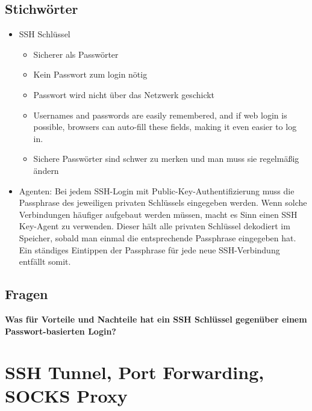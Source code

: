 \documentclass[12pt,a4paper]{article}
\begin{document}
\subsection{Stichwörter}
\begin{itemize}
    \item SSH Schlüssel
    \begin{itemize}
        \item Sicherer als Passwörter
	    \item Kein Passwort zum login nötig
	    \item Passwort wird nicht über das Netzwerk geschickt
	    \item Usernames and passwords are easily remembered, and if web login is possible, 
	  browsers can auto-fill these fields, making it even easier to log in.
	    \item Sichere Passwörter sind schwer zu merken und man muss sie regelmäßig ändern
    \end{itemize}
    \item Agenten: Bei jedem SSH-Login mit Public-Key-Authentifizierung muss die Passphrase des jeweiligen privaten Schlüssels eingegeben werden. Wenn solche Verbindungen häufiger aufgebaut werden müssen, macht es Sinn einen SSH Key-Agent zu verwenden. Dieser hält alle privaten Schlüssel dekodiert im Speicher, sobald man einmal die entsprechende Passphrase eingegeben hat. Ein ständiges Eintippen der Passphrase für jede neue SSH-Verbindung entfällt somit.
\end{itemize}
\subsection{Fragen}
\textbf{Was für Vorteile und Nachteile hat ein SSH Schlüssel gegenüber einem Passwort-basierten Login?}
\bigskip




\section{SSH Tunnel, Port Forwarding, SOCKS Proxy}
\end{document}
